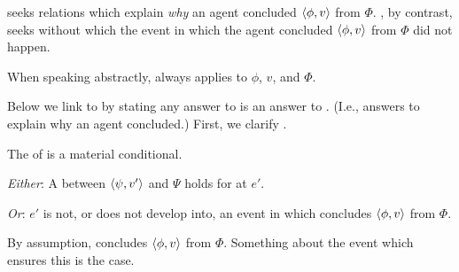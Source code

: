 \begin{note}
  \qWhy{} seeks relations which explain \emph{why} an agent concluded \(\langle \phi, v \rangle\) from \(\Phi\).
  \qWhyV{}, by contrast, seeks \ros{} without which the event in which the agent concluded \(\langle \phi, v \rangle\) from \(\Phi\) did not happen.
\end{note}

\begin{note}
  \begin{notation}
  \item
    When speaking abstractly, \qWhyV{} always applies to \(\phi\), \(v\), and \(\Phi\).
  \end{notation}
\end{note}

\begin{note}
  Below we link \qWhyV{} to \qWhy{} by stating any answer to \qWhyV{} is an answer to \qWhy{}.
  (I.e., answers to \qWhyV{} explain why an agent concluded.)
  First, we clarify \qWhyV{}.
\end{note}

\begin{note}
  The \itc{} of \qWhyV{} is a material conditional.
  \begin{itenum}
  \item[\emph{Either}:]
    A  between \(\langle \psi, v' \rangle\) and \(\Psi\) holds for \vAgent{} at \(e'\).
  \item[\emph{Or}:]
    \(e'\) is not, or does not develop into, an event in which \vAgent{} concludes \(\langle \phi, v \rangle\) from \(\Phi\).
  \end{itenum}

  By assumption, \vAgent{} concludes \(\langle \phi, v \rangle\) from \(\Phi\).
  Something about the event which ensures this is the case.
\end{note}

